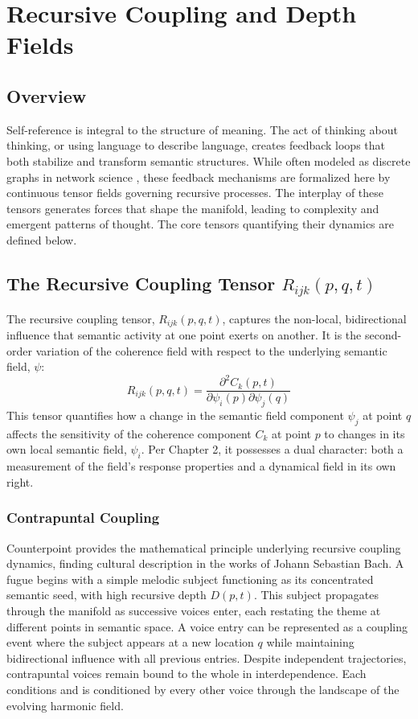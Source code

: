 \chapter{Recursive Coupling and Depth Fields}

\section{Overview}

Self-reference is integral to the structure of meaning. The act of thinking about thinking, or using language to describe language, creates feedback loops that both stabilize and transform semantic structures. While often modeled as discrete graphs in network science \autocite{Barabasi2016}, these feedback mechanisms are formalized here by continuous tensor fields governing recursive processes. The interplay of these tensors generates forces that shape the manifold, leading to complexity and emergent patterns of thought. The core tensors quantifying their dynamics are defined below.

\section{\texorpdfstring{The Recursive Coupling Tensor $R_{ijk}(p, q, t)$}{The Recursive Coupling Tensor R_ijk(p, q, t)}}

The recursive coupling tensor, \(R_{ijk}(p, q, t)\), captures the non-local, bidirectional influence that semantic activity at one point exerts on another. It is the second-order variation of the coherence field with respect to the underlying semantic field, \(\psi\):
\begin{equation}
R_{ijk}(p, q, t) = \frac{\partial^2 C_k(p,t)}{\partial \psi_i(p) \partial \psi_j(q)}
\end{equation}
This tensor quantifies how a change in the semantic field component \(\psi_j\) at point \(q\) affects the sensitivity of the coherence component \(C_k\) at point \(p\) to changes in its own local semantic field, \(\psi_i\). Per Chapter 2, it possesses a dual character: both a measurement of the field's response properties and a dynamical field in its own right.

\subsection{Contrapuntal Coupling}

Counterpoint provides the mathematical principle underlying recursive coupling dynamics, finding cultural description in the works of Johann Sebastian Bach. A fugue begins with a simple melodic subject functioning as its concentrated semantic seed, with high recursive depth \(D(p,t)\). This subject propagates through the manifold as successive voices enter, each restating the theme at different points in semantic space. A voice entry can be represented as a coupling event where the subject appears at a new location \(q\) while maintaining bidirectional influence with all previous entries. Despite independent trajectories, contrapuntal voices remain bound to the whole in interdependence. Each conditions and is conditioned by every other voice through the landscape of the evolving harmonic field.

